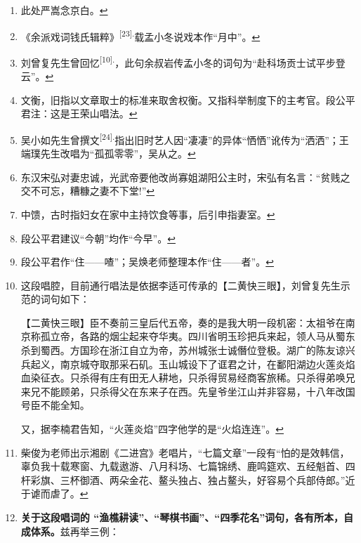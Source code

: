 \begin{enumerate}
\item
  \leavevmode\hypertarget{fn596}{}%
  此处严嵩念京白。\protect\hyperlink{fnref596}{↩}
\item
  \leavevmode\hypertarget{fn597}{}%
  《余派戏词钱氏辑粹》\textsuperscript{{[}23{]}.}载孟小冬说戏本作``月中''。\protect\hyperlink{fnref597}{↩}
\item
  \leavevmode\hypertarget{fn598}{}%
  刘曾复先生曾回忆\textsuperscript{{[}10{]}.}，此句余叔岩传孟小冬的词句为``赴科场贡士试平步登云''。\protect\hyperlink{fnref598}{↩}
\item
  \leavevmode\hypertarget{fn599}{}%
  文衡，旧指以文章取士的标准来取舍权衡。又指科举制度下的主考官。段公平君注：这是王荣山唱法。\protect\hyperlink{fnref599}{↩}
\item
  \leavevmode\hypertarget{fn600}{}%
  吴小如先生曾撰文\textsuperscript{{[}24{]}.}指出旧时艺人因``凄凄''的异体``恓恓''讹传为``洒洒''；王端璞先生改唱为``孤孤零零''，吴从之。\protect\hyperlink{fnref600}{↩}
\item
  \leavevmode\hypertarget{fn601}{}%
  东汉宋弘对妻忠诚，光武帝要他改尚寡姐湖阳公主时，宋弘有名言：``贫贱之交不可忘，糟糠之妻不下堂!''\protect\hyperlink{fnref601}{↩}
\item
  \leavevmode\hypertarget{fn602}{}%
  中馈，古时指妇女在家中主持饮食等事，后引申指妻室。\protect\hyperlink{fnref602}{↩}
\item
  \leavevmode\hypertarget{fn603}{}%
  段公平君建议``今朝''均作``今早''。\protect\hyperlink{fnref603}{↩}
\item
  \leavevmode\hypertarget{fn604}{}%
  段公平君作``住------喳''；吴焕老师整理本作``住------者''。\protect\hyperlink{fnref604}{↩}
\item
  \leavevmode\hypertarget{fn605}{}%
  这段唱腔，目前通行唱法是依据李适可传承的【二黄快三眼】，刘曾复先生示范的词句如下：

  【二黄快三眼】臣不奏前三皇后代五帝，奏的是我大明一段机密：太祖爷在南京称孤立帝，各路的烟尘起来夺华夷。四川省明玉珍把兵来起，领人马从蜀东杀到蜀西。方国珍在浙江自立为帝，苏州城张士诚僭位登极。湖广的陈友谅兴兵起义，南京城夺取那采石矶。玉山城设下了诓君之计，在鄱阳湖边火莲炎焰血染征衣。只杀得有庄有田无人耕地，只杀得贸易经商客旅稀。只杀得弟唤兄来兄不能顾弟，只杀得父在东来子在西。先皇爷坐江山并非容易，十八年改国号臣不能全知。

  又，据李楠君告知，``火莲炎焰''四字他学的是``火焰连连''。\protect\hyperlink{fnref605}{↩}
\item
  \leavevmode\hypertarget{fn606}{}%
  柴俊为老师出示湘剧《二进宫》老唱片，``七篇文章''一段有``怕的是效韩信，辜负我十载寒窗、九载遨游、八月科场、七篇锦绣、鹿鸣筵欢、五经魁首、四杆彩旗、三杯御酒、两朵金花、鳌头独占、独占鳌头，好容易个兵部侍郎。''近于谑而虐了。\protect\hyperlink{fnref606}{↩}
\item
  \leavevmode\hypertarget{fn607}{}%
  \textbf{关于这段唱词的
  ``渔樵耕读''、``琴棋书画''、``四季花名''词句，各有所本，自成体系。}兹再举三例：


\end{enumerate}
